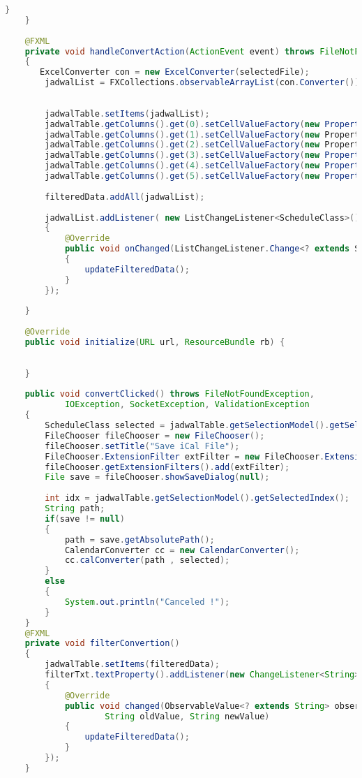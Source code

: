 \begin{lstlisting}[language=Java,basicstyle=\tiny,caption=FXMLDocumentController.java,label=lst:FXMLDocumentController]
          }
    }
    
    @FXML
    private void handleConvertAction(ActionEvent event) throws FileNotFoundException, IOException
    {
       ExcelConverter con = new ExcelConverter(selectedFile);
        jadwalList = FXCollections.observableArrayList(con.Converter());
        
        
        jadwalTable.setItems(jadwalList);
        jadwalTable.getColumns().get(0).setCellValueFactory(new PropertyValueFactory("Date"));
        jadwalTable.getColumns().get(1).setCellValueFactory(new PropertyValueFactory<>("timeAwal"));
        jadwalTable.getColumns().get(2).setCellValueFactory(new PropertyValueFactory<>("timeAkhir"));
        jadwalTable.getColumns().get(3).setCellValueFactory(new PropertyValueFactory("Subject"));
        jadwalTable.getColumns().get(4).setCellValueFactory(new PropertyValueFactory("Dosen"));
        jadwalTable.getColumns().get(5).setCellValueFactory(new PropertyValueFactory("Location"));
        
        filteredData.addAll(jadwalList);
        
        jadwalList.addListener( new ListChangeListener<ScheduleClass>()
        {
            @Override
            public void onChanged(ListChangeListener.Change<? extends ScheduleClass> change)
            {
                updateFilteredData();
            }
        });
        
    }
    
    @Override
    public void initialize(URL url, ResourceBundle rb) {
      
        
    } 
    
    public void convertClicked() throws FileNotFoundException, 
            IOException, SocketException, ValidationException
    {
        ScheduleClass selected = jadwalTable.getSelectionModel().getSelectedItem();
        FileChooser fileChooser = new FileChooser();
        fileChooser.setTitle("Save iCal File");
        FileChooser.ExtensionFilter extFilter = new FileChooser.ExtensionFilter("iCalendar files (*.ics)", "*.ics");
        fileChooser.getExtensionFilters().add(extFilter);
        File save = fileChooser.showSaveDialog(null);
        
        int idx = jadwalTable.getSelectionModel().getSelectedIndex();
        String path;
        if(save != null)
        {
            path = save.getAbsolutePath();
            CalendarConverter cc = new CalendarConverter();
            cc.calConverter(path , selected);
        }
        else
        {
            System.out.println("Canceled !");
        }
    }
    @FXML
    private void filterConvertion()
    {
        jadwalTable.setItems(filteredData);
        filterTxt.textProperty().addListener(new ChangeListener<String>()
        {
            @Override
            public void changed(ObservableValue<? extends String> observable,
                    String oldValue, String newValue)
            {
                updateFilteredData();
            }
        });   
    }
    

\end{lstlisting}
